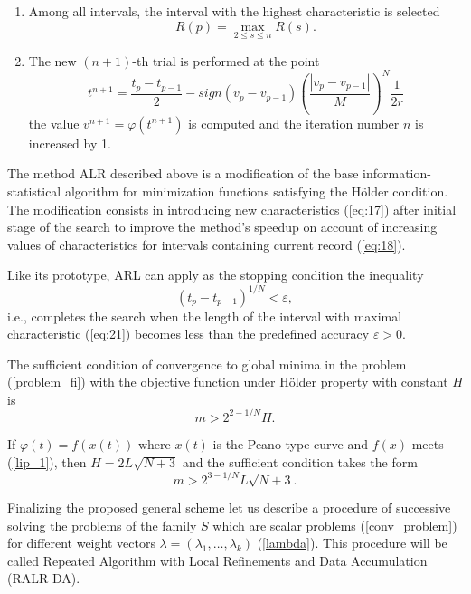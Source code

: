 \documentclass[]{interact}
\theoremstyle{plain}%
\theoremstyle{definition}
\theoremstyle{remark}
\begin{document}
\begin{enumerate}
\item
Among all intervals, the interval   with the highest characteristic is selected
\begin{equation}\label{eq:21}
R(p) = \max_{2 \leq s \leq n} {R(s)}.
\end{equation}

\item
The new $(n+1)$-th trial is performed at the point
\begin{equation}\label{eq:22}
t^{n+1} = \frac{t_p-t_{p-1}}{2} - sign(v_p-v_{p-1}) \left( \frac{|v_p-v_{p-1}|}{M} \right)^N \frac{1}{2r} 
\end{equation}
the value $v^{n+1} = \varphi(t^{n+1})$ is computed and the iteration number $n$ is increased by 1.

\end{enumerate}


The method ALR described above is a modification of the base information-statistical algorithm \cite{Strongin2000,Sergeyev2013} for minimization functions satisfying the H{\"o}lder condition. The modification consists in introducing new characteristics (\ref{eq:17}) after initial stage of the search to improve the method's speedup on account of increasing values of characteristics for intervals containing current record (\ref{eq:18}). 

Like its prototype, ARL can apply as the stopping condition the inequality
\begin{equation}\label{eq:23}
(t_p-t_{p-1})^{1/N} < \varepsilon,
\end{equation}
i.e., completes the search when the length of the interval with maximal characteristic (\ref{eq:21}) becomes less than the predefined accuracy $\varepsilon > 0$.

The sufficient condition of convergence to global minima in the problem (\ref{problem_fi}) with the objective function under H{\"o}lder property with constant $H$ is
\begin{equation}\label{eq:24}
m > 2^{2 - 1 / N}H.
\end{equation}

If $\varphi(t) = f(x(t)) $ where $x(t)$ is the Peano-type curve and $f(x)$ meets (\ref{lip_1}), then $H=2L\sqrt{N+3}$ and the sufficient condition takes the form 
\begin{equation}\label{eq:25}
m > 2^{3 - 1 / N}L\sqrt{N+3}.
\end{equation}

Finalizing the proposed general scheme  let us describe a procedure  of successive solving the problems of the family $S$ which are scalar problems (\ref{conv_problem}) for different weight vectors $\lambda = (\lambda_1, \dots,\lambda_k)$ (\ref{lambda}). This procedure will be called Repeated Algorithm with Local Refinements and Data Accumulation (RALR-DA).
\end{document}
